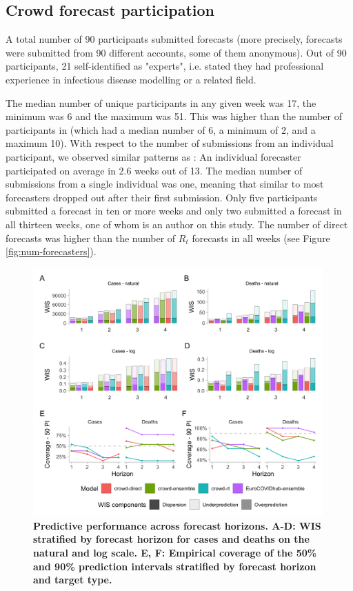 \documentclass[10pt,a4paper,twocolumn]{article}
\begin{document}
\subsection*{Crowd forecast participation}

A total number of 90 participants submitted forecasts (more precisely, forecasts were submitted from 90 different accounts, some of them anonymous). Out of 90 participants, 21 self-identified as "experts", i.e. stated they had professional experience in infectious disease modelling or a related field. 

The median number of unique participants in any given week was 17, the minimum was 6 and the maximum was 51. This was higher than the number of participants in \cite{bosseComparingHumanModelbased2022} (which had a median number of 6, a minimum of 2, and a maximum 10). With respect to the number of submissions from an individual participant, we observed similar patterns as \cite{bosseComparingHumanModelbased2022}: An individual forecaster participated on average in 2.6 weeks out of 13. The median number of submissions from a single individual was one, meaning that similar to \citep{bosseComparingHumanModelbased2022} most forecasters dropped out after their first submission. Only five participants submitted a forecast in ten or more weeks and only two submitted a forecast in all thirteen weeks, one of whom is an author on this study. The number of direct forecasts was higher than the number of $R_t$ forecasts in all weeks (see Figure \ref{fig:num-forecasters}). 



\begin{figure}[ht]
\includegraphics[width=0.99\textwidth]{../output/figures/performance.png}
\caption{\bf{Predictive performance across forecast horizons.} A-D: WIS stratified by forecast horizon for cases and deaths on the natural and log scale. E, F: Empirical coverage of the 50\% and 90\% prediction intervals stratified by forecast horizon and target type.}
\label{fig:performance}
\end{figure}
\end{document}
